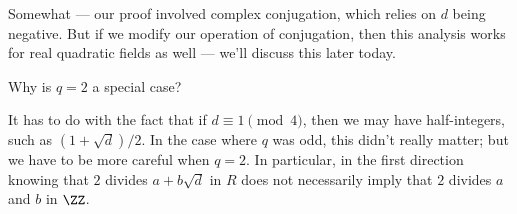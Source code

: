\begin{ans}
Somewhat --- our proof involved complex conjugation, which relies on $d$ being negative. But if we modify our operation of conjugation, then this analysis works for real quadratic fields as well --- we'll discuss this later today. 
\end{ans}

\begin{question}
Why is $q = 2$ a special case?
\end{question}

\begin{ans}
It has to do with the fact that if $d \equiv 1 \pmod{4}$, then we may have half-integers, such as $(1 + \sqrt{d})/2$. In the case where $q$ was odd, this didn't really matter; but we have to be more careful when $q = 2$. In particular, in the first direction knowing that $2$ divides $a + b\sqrt{d}$ in $R$ does not necessarily imply that $2$ divides $a$ and $b$ in $\ZZ$. 
\end{ans}




